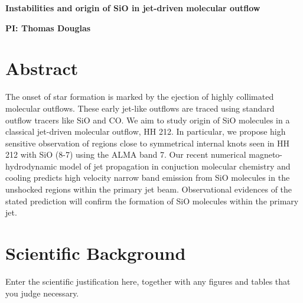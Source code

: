 \documentclass[12pt,a4paper]{article}
\begin{document}
\pagestyle{plain}
 

\begin{center}
{\LARGE{\bf
{Instabilities and origin of SiO in jet-driven molecular outflow}
}}
\end{center}
\bigskip

\centerline{\bf PI: 
{Thomas Douglas}}

\bigskip


\section{Abstract}
The onset of star formation is marked by the ejection of highly
collimated molecular outflows. These early jet-like outflows
are traced using standard outflow tracers like 
SiO and CO. We aim to study 
origin of SiO molecules in a classical jet-driven molecular outflow,
HH 212. In particular, we
propose high sensitive observation of regions close to symmetrical internal knots seen in
HH 212 with SiO (8-7) using the ALMA band 7.
Our recent numerical magneto-hydrodynamic model of 
jet propagation in conjuction molecular chemistry and cooling 
predicts high velocity narrow band emission 
from SiO molecules in the unshocked regions
within the primary jet beam. Observational evidences of the stated
prediction will confirm the formation of SiO molecules 
within the primary jet.
  
 




\section{Scientific Background}

Enter the scientific justification here, together with any figures and tables that you judge necessary.
 
\begin{figure}[tbh]
\end{figure}
\end{document}
